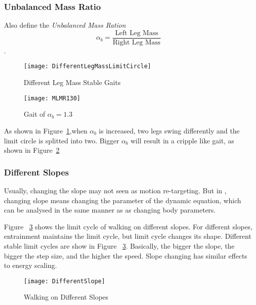 \subsubsection*{Unbalanced Mass Ratio}
Also define the \emph{Unbalanced Mass Ration} 
\[
\alpha_b=\frac{\text{Left Leg Mass}}{\text{Right Leg Mass}}
\].


\begin{figure}[!htbp]
  \begin{center}
      \texttt{[image: DifferentLegMassLimitCircle]}
    \caption{Different Leg Mass Stable Gaits}
    \label{fig:differentlr}
\end{center}
\end{figure}




\begin{figure}[!htbp]
  \begin{center}
      \texttt{[image: MLMR130]}
    \caption{Gait of $\alpha_b=1.3$}
    \label{fig:lm2}
\end{center}
\end{figure}
As shown in Figure~\ref{fig:differentlr},when $\alpha_b$ is increased, two legs swing differently and the limit circle is splitted into two.
Bigger $\alpha_b$  will result in a cripple like gait, as shown in Figure~\ref{fig:lm2}



\subsubsection*{Different Slopes}
Usually, changing the slope may not seen as motion re-targeting.
But in \moit, changing slope means changing the parameter of the dynamic equation, which can be analysed in the same manner as as changing body parameters.


Figure ~\ref{fig:diffslopes} shows the limit cycle of walking on different slopes.
For different slopes, entrainment maintains the limit cycle, but limit cycle changes its shape.
Different stable limit cycles are show in Figure ~\ref{fig:diffslopes}.
Basically, the bigger the slope, the bigger the step size, and the higher the speed.
Slope changing has similar effects to energy scaling.



\begin{figure}[!htbp]
  \begin{center}
      \texttt{[image: DifferentSlope]}
    \caption{Walking on Different Slopes}
    \label{fig:diffslopes}
\end{center}
\end{figure}

